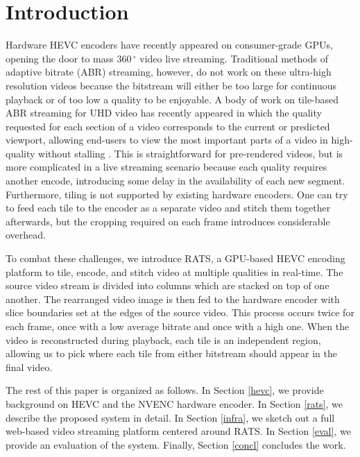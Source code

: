 
\section{Introduction} \label{intro}

Hardware HEVC encoders have recently appeared on consumer-grade GPUs, opening the door to mass $360\,^{\circ}$ video live streaming. Traditional methods of adaptive bitrate (ABR) streaming, however, do not work on these ultra-high resolution videos because the bitstream will either be too large for continuous playback or of too low a quality to be enjoyable. A body of work on tile-based ABR streaming for UHD video has recently appeared in which the quality requested for each section of a video corresponds to the current or predicted viewport, allowing end-users to view the most important parts of a video in high-quality without stalling \cite{lefeuvre2016} \cite{corbillon2016} \cite{corbillon2018}. This is straightforward for pre-rendered videos, but is more complicated in a live streaming scenario because each quality requires another encode, introducing some delay in the availability of each new segment. Furthermore, tiling is not supported by existing hardware encoders. One can try to feed each tile to the encoder as a separate video and stitch them together afterwards, but the cropping required on each frame introduces considerable overhead.

To combat these challenges, we introduce RATS, a GPU-based HEVC encoding platform to tile, encode, and stitch video at multiple qualities in real-time. The source video stream is divided into columns which are stacked on top of one another. The rearranged video image is then fed to the hardware encoder with slice boundaries set at the edges of the source video. This process occurs twice for each frame, once with a low average bitrate and once with a high one. When the video is reconstructed during playback, each tile is an independent region, allowing us to pick where each tile from either bitstream should appear in the final video.

The rest of this paper is organized as follows. In Section \ref{hevc}, we provide background on HEVC and the NVENC hardware encoder. In Section \ref{rats}, we describe the proposed system in detail. In Section \ref{infra}, we sketch out a full web-based video streaming platform centered around RATS. In Section \ref{eval}, we provide an evaluation of the system. Finally, Section \ref{concl} concludes the work.

